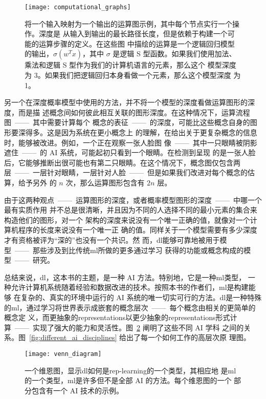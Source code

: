 \begin{figure}[h]
  \centering
  \texttt{[image: computational\_graphs]}
  \caption{将一个输入映射为一个输出的运算图示例，其中每个节点实行一个操作。深度是
    从输入到输出的最长路径长度，但是依赖于构建一个可能的运算步骤的定义。在这些图
    中描绘的运算是一个逻辑回归模型的输出，$\sigma(w^Tx)$，其中 $\sigma$ 是逻辑 S
    型函数。如果我们使用加法、乘法和逻辑 S 型作为我们的计算机语言的元素，那么这个
    模型深度为 3。如果我们把逻辑回归本身看做一个元素，那么这个模型深度
    为 1。\label{fig:computational_graphs}}
\end{figure}

另一个在深度概率模型中使用的方法，并不将一个模型的深度看做运算图形的深度，而是描
述概念间如何彼此相互关联的图形深度。在这种情况下，运算流程图~——~其中需要计算每个
概念的表征~——~的深度，可能比这些概念自身的图形要深得多。这是因为系统在更小概念上
的理解，在给出关于更复杂概念的信息时，能够被改进。例如，一个正在观察一张人脸图
像~——~其中一只眼睛被阴影遮住~——~的 AI 系统，可能起初只看到一个眼睛。在检测到呈现
的是一张人脸后，它能够推断出很可能也有第二只眼睛。在这个情况下，概念图仅包含两
层~——~一层针对眼睛，一层针对人脸~——~但是如果我们改进对每个概念的估算，给予另外
的 $n$ 次，那么运算图形包含有 $2n$ 层。

由于这两种观点~——~运算图形的深度，或者概率模型图形的深度~——~中哪一个最有实质作用
并不总是很清晰，并且因为不同的人选择不同的最小元素的集合来构造他们的图形，对一个
架构的深度来说没有一个唯一正确的值，就像对一个计算机程序的长度来说没有一个唯一正
确的值。同样关于一个模型需要有多少深度才有资格被评为``深的''也没有一个共识。然
而，\gls*{dl}能够可靠地被用于模型~——~那些涉及到比传统\gls*{ml}所做的更多通过学习
获得的功能或概念构成的模型~——~研究。

总结来说，\gls*{dl}，这本书的主题，是一种 AI 方法。特别地，它是一种\gls*{ml}类型，
一种允许计算机系统随着经验和数据改进的技术。按照本书的作者们，\gls*{ml}是构建能够
在复杂的、真实的环境中运行的 AI 系统的唯一切实可行的方法。\gls*{dl}是一种特殊
的\gls*{ml}，通过学习将世界表示成嵌套的概念层次~——~每个概念由相关的更简单的概念定
义，而更抽象的\gls*{representations}以更少抽象的\gls*{representations}形式计
算~——~实现了强大的能力和灵活性。图~\ref{fig:venn_diagram} 阐明了这些不同 AI 学科
之间的关系。图~\ref{fig:different_ai_disciplines} 给出了每一个如何工作的高层次原
理图。

\begin{figure}[h]
  \centering
  \texttt{[image: venn\_diagram]}
  \caption{一个维恩图，显示\gls*{dl}如何是\gls*{rep-learning}的一个类型，其相应地
    是\gls*{ml}的一个类型，\gls*{ml}是许多但不是全部 AI 的方法。每个维恩图的一个
    部分包含有一个 AI 技术的示例。\label{fig:venn_diagram}}
\end{figure}

